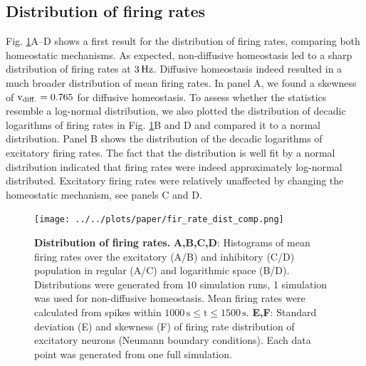 \documentclass[10pt,letterpaper]{article}
\begin{document}
\subsection*{Distribution of firing rates}\label{Fir_Dist_Section}
Fig. \ref{Fir_Rate_Dist_Comp}A--D shows a first result for the distribution of firing rates, comparing both homeostatic mechanisms. As expected, non-diffusive homeostasis led to a sharp distribution of firing rates at $\rm 3\, Hz$. Diffusive homeostasis indeed resulted in a much broader distribution of mean firing rates. In panel A, we found a skewness of $\mathrm{v_{\rm diff.} = 0.765}$ for diffusive homeostasis. To assess whether the statistics resemble a log-normal distribution, we also plotted the distribution of decadic logarithms of firing rates in Fig. \ref{Fir_Rate_Dist_Comp}B and D and compared it to a normal distribution. Panel B shows the distribution of the decadic logarithms of excitatory firing rates. The fact that the distribution is well fit by a normal distribution indicated that firing rates were indeed approximately log-normal distributed. Excitatory firing rates were relatively unaffected by changing the homeostatic mechanism, see panels C and D.  

\begin{figure}
\begin{center}
\texttt{[image: ../../plots/paper/fir\_rate\_dist\_comp.png]}
\end{center}
\caption{{\bf Distribution of firing rates.} \textbf{A,B,C,D}: Histograms of mean firing rates over the excitatory (A/B) and inhibitory (C/D) population in regular (A/C) and logarithmic space (B/D). Distributions were generated from 10 simulation runs, 1 simulation was used for non-diffusive homeostasis. Mean firing rates were calculated from spikes within $\mathrm{1000\,s \leq t \leq 1500\,s}$. \textbf{E,F}: Standard deviation (E) and skewness (F) of firing rate distribution of excitatory neurons (Neumann boundary conditions). Each data point was generated from one full simulation.}
\label{Fir_Rate_Dist_Comp}
\end{figure}
\end{document}
